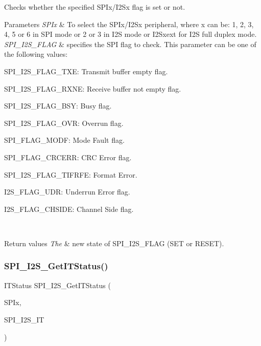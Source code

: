 Checks whether the specified S\+P\+Ix/\+I2\+Sx flag is set or not. 


\begin{DoxyParams}{Parameters}
{\em S\+P\+Ix} & To select the S\+P\+Ix/\+I2\+Sx peripheral, where x can be\+: 1, 2, 3, 4, 5 or 6 in S\+PI mode or 2 or 3 in I2S mode or I2\+Sxext for I2S full duplex mode. \\
\hline
{\em S\+P\+I\+\_\+\+I2\+S\+\_\+\+F\+L\+AG} & specifies the S\+PI flag to check. This parameter can be one of the following values\+: \begin{DoxyItemize}
\item S\+P\+I\+\_\+\+I2\+S\+\_\+\+F\+L\+A\+G\+\_\+\+T\+XE\+: Transmit buffer empty flag. \item S\+P\+I\+\_\+\+I2\+S\+\_\+\+F\+L\+A\+G\+\_\+\+R\+X\+NE\+: Receive buffer not empty flag. \item S\+P\+I\+\_\+\+I2\+S\+\_\+\+F\+L\+A\+G\+\_\+\+B\+SY\+: Busy flag. \item S\+P\+I\+\_\+\+I2\+S\+\_\+\+F\+L\+A\+G\+\_\+\+O\+VR\+: Overrun flag. \item S\+P\+I\+\_\+\+F\+L\+A\+G\+\_\+\+M\+O\+DF\+: Mode Fault flag. \item S\+P\+I\+\_\+\+F\+L\+A\+G\+\_\+\+C\+R\+C\+E\+RR\+: C\+RC Error flag. \item S\+P\+I\+\_\+\+I2\+S\+\_\+\+F\+L\+A\+G\+\_\+\+T\+I\+F\+R\+FE\+: Format Error. \item I2\+S\+\_\+\+F\+L\+A\+G\+\_\+\+U\+DR\+: Underrun Error flag. \item I2\+S\+\_\+\+F\+L\+A\+G\+\_\+\+C\+H\+S\+I\+DE\+: Channel Side flag. ~\newline
\end{DoxyItemize}
\\
\hline
\end{DoxyParams}

\begin{DoxyRetVals}{Return values}
{\em The} & new state of S\+P\+I\+\_\+\+I2\+S\+\_\+\+F\+L\+AG (S\+ET or R\+E\+S\+ET). \\
\hline
\end{DoxyRetVals}
\mbox{\label{group___s_p_i_ga72decbc1cd79f8fad92a2204beca6bc5}} 
\subsubsection{\texorpdfstring{S\+P\+I\+\_\+\+I2\+S\+\_\+\+Get\+I\+T\+Status()}{SPI\_I2S\_GetITStatus()}}
{\footnotesize\ttfamily I\+T\+Status S\+P\+I\+\_\+\+I2\+S\+\_\+\+Get\+I\+T\+Status (\begin{DoxyParamCaption}\item[{S\+P\+I\+\_\+\+Type\+Def $\ast$}]{S\+P\+Ix,  }\item[{uint8\+\_\+t}]{S\+P\+I\+\_\+\+I2\+S\+\_\+\+IT }\end{DoxyParamCaption})}



